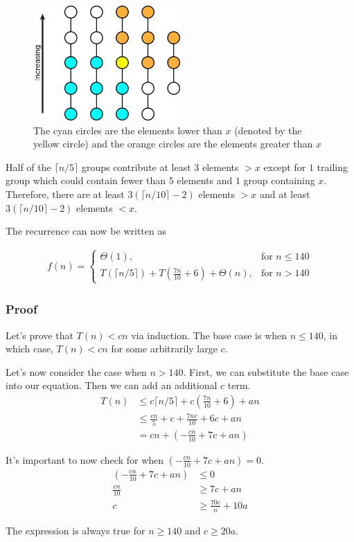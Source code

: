\documentclass[12pt]{article}
\newcommand\ceil[1]{\lceil#1\rceil}
\begin{document}
\begin{figure}[h]
	\includegraphics[width=0.5\textwidth]{../pics/medians_circles.png}
	\centering
	\caption{The cyan circles are the elements lower than $x$ (denoted by the yellow circle) and the orange circles are the elements greater than $x$}
\end{figure}

\par{Half of the $\ceil{n / 5}$ groups contribute at least 3 elements $> x$ except for $1$ trailing group which could contain fewer than $5$ elements and $1$ group containing $x$. Therefore, there are at least $3(\ceil{n / 10} - 2)$ elements $> x$ and at least $3(\ceil{n / 10} - 2)$ elements $< x$.}
\par{The recurrence can now be written as}

\begin{align*}
f(n) = 
\begin{cases} 
	\Theta(1), & \mbox{for } n \leq 140 \\
	T(\ceil{n / 5}) + T(\frac{7n}{10} + 6) + \Theta(n), & \mbox{for } n > 140
\end{cases}
\end{align*}

\subsubsection*{Proof}
\par{Let's prove that $T(n) < cn$ via induction. The base case is when $n \leq 140$, in which case, $T(n) < cn$ for some arbitrarily large $c$.}
\par{Let's now consider the case when $n > 140$. First, we can substitute the base case into our equation. Then we can add an additional $c$ term.}
\begin{align*}
T(n) &\leq c\ceil{n / 5} + c(\frac{7n}{10} + 6) + an \\
&\leq \frac{cn}{5} + c + \frac{7nc}{10} + 6c + an \\
&= cn + (-\frac{cn}{10} + 7c + an)
\end{align*}
\par{It's important to now check for when $(-\frac{cn}{10} + 7c + an) = 0$.}
\begin{align*}
(-\frac{cn}{10} + 7c + an) &\leq 0 \\
\frac{cn}{10} &\geq 7c + an \\
c &\geq \frac{70c}{n} + 10a
\end{align*}
\par{The expression is always true for $n \geq 140$ and $c \geq 20a$.}
\end{document}
